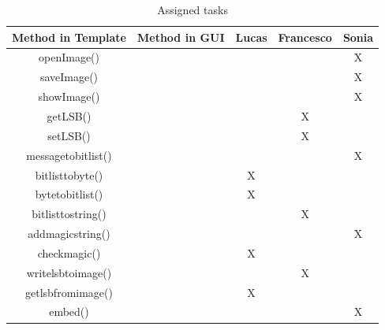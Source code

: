 \documentclass[
parskip=full,               %
12pt,                       %
twoside,                    %
a4paper                     %
]{article}
\begin{document}
\begin{table}[]
\centering
\caption{Assigned tasks}
\label{task}
\begin{tabular}{|c|c|c|c|c|}
\hline
\textbf{Method in Template} & \textbf{Method in GUI}                                                   & Lucas & Francesco & Sonia \\ \hline
openImage()        &                                                                 &       &           & X     \\ \hline
saveImage()        &                                                                 &       &           & X     \\ \hline
showImage()        &                                                                 &       &           & X     \\ \hline
getLSB()           &                                                                 &       & X         &       \\ \hline
setLSB()           &                                                                 &       & X         &       \\ \hline
messagetobitlist() &                                                                 &       &           & X     \\ \hline
bitlisttobyte()    &                                                                 & X     &           &       \\ \hline
bytetobitlist()    &                                                                 & X     &           &       \\ \hline
bitlisttostring()  &                                                                 &       & X         &       \\ \hline
addmagicstring()   &                                                                 &       &           & X     \\ \hline
checkmagic()       &                                                                 & X     &           &       \\ \hline
writelsbtoimage()  &                                                                 &       & X         &       \\ \hline
getlsbfromimage()  &                                                                 & X     &           &       \\ \hline
embed()            &                                                                 &       &           & X     \\ \hline

\end{tabular}
\end{table}
\end{document}
